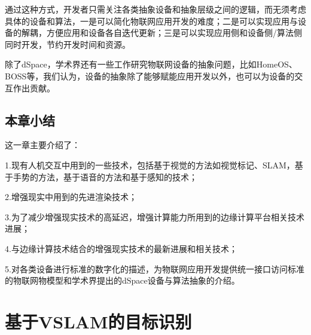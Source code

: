 通过这种方式，开发者只需关注各类抽象设备和抽象层级之间的逻辑，而无须考虑具体的设备和算法，一是可以简化物联网应用开发的难度；二是可以实现应用与设备的解耦，方便应用和设备各自迭代更新；三是可以实现应用侧和设备侧/算法侧同时开发，节约开发时间和资源。

除了dSpace，学术界还有一些工作研究物联网设备的抽象问题，比如HomeOS\cite{DixMahAga10}、BOSS\cite{DawKriTan13}等，我们认为，设备的抽象除了能够赋能应用开发以外，也可以为设备的交互作出贡献。

\section{本章小结}
这一章主要介绍了：

1.现有人机交互中用到的一些技术，包括基于视觉的方法如视觉标记、SLAM，基于手势的方法，基于语音的方法和基于感知的技术；

2.增强现实中用到的先进渲染技术；

3.为了减少增强现实技术的高延迟，增强计算能力所用到的边缘计算平台相关技术进展；

4.与边缘计算技术结合的增强现实技术的最新进展和相关技术；

5.对各类设备进行标准的数字化的描述，为物联网应用开发提供统一接口访问标准的物联网物模型和学术界提出的dSpace设备与算法抽象的介绍。









\chapter{基于VSLAM的目标识别}
\label{chap:vslam}

